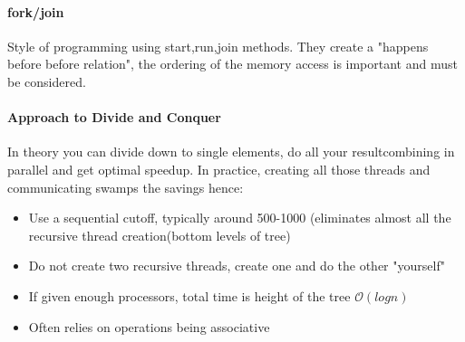 \documentclass[8pt]{extreport}
\begin{document}
\paragraph{fork/join} Style of programming using start,run,join methods. They create a "happens before before relation", the ordering of the memory access is important and must be considered.
\paragraph{Approach to Divide and Conquer} In theory you can divide down to single elements, do all your resultcombining in parallel and get optimal speedup. In practice, creating all those threads and communicating swamps the savings hence:
\begin{itemize}
\item Use a sequential cutoff, typically around 500-1000 (eliminates almost all the recursive thread creation(bottom levels of tree)
\item Do not create two recursive threads, create one and do the other "yourself"
\item If given enough processors, total time is height of the tree $\mathcal{O}(logn)$ 
\item Often relies on operations being associative
\end{itemize}
\end{document}
